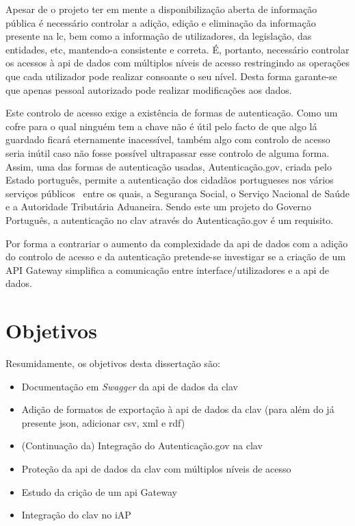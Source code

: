 Apesar de o projeto ter em mente a disponibilização aberta de informação pública é necessário controlar a adição, edição e eliminação da informação presente na \acrlong{lc}, bem como a informação de utilizadores, da legislação, das entidades, etc, mantendo-a consistente e correta. É, portanto, necessário controlar os acessos à \acrshort{api} de dados com múltiplos níveis de acesso restringindo as operações que cada utilizador pode realizar consoante o seu nível. Desta forma garante-se que apenas pessoal autorizado pode realizar modificações aos dados.

Este controlo de acesso exige a existência de formas de autenticação. Como um cofre para o qual ninguém tem a chave não é útil pelo facto de que algo lá guardado ficará eternamente inacessível, também algo com controlo de acesso seria inútil caso não fosse possível ultrapassar esse controlo de alguma forma. Assim, uma das formas de autenticação usadas, Autenticação.gov, criada pelo Estado português, permite a autenticação dos cidadãos portugueses nos vários serviços públicos~\cite{authgov} entre os quais, a Segurança Social, o Serviço Nacional de Saúde e a Autoridade Tributária Aduaneira. Sendo este um projeto do Governo Português, a autenticação no \acrshort{clav} através do Autenticação.gov é um requisito.

Por forma a contrariar o aumento da complexidade da \acrshort{api} de dados com a adição do controlo de acesso e da autenticação pretende-se investigar se a criação de um API Gateway simplifica a comunicação entre interface/utilizadores e a \acrshort{api} de dados.

\section{Objetivos}
Resumidamente, os objetivos desta dissertação são:

\begin{itemize}
    \item Documentação em \textit{Swagger} da \acrshort{api} de dados da \acrshort{clav}
    \item Adição de formatos de exportação à \acrshort{api} de dados da \acrshort{clav} (para além do já presente \acrshort{json}, adicionar \acrshort{csv}, \acrshort{xml} e \acrshort{rdf})
    \item (Continuação da) Integração do Autenticação.gov na \acrshort{clav}
    \item Proteção da \acrshort{api} de dados da \acrshort{clav} com múltiplos níveis de acesso
    \item Estudo da crição de um \acrshort{api} Gateway
    \item Integração do \acrshort{clav} no iAP
\end{itemize}

